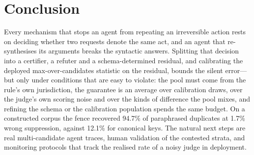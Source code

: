 \section{Conclusion}\label{sec:conclusion}

Every mechanism that stops an agent from repeating an irreversible action rests on deciding whether two requests denote the same act, and an agent that re-synthesises its arguments breaks the syntactic answers. Splitting that decision into a certifier, a refuter and a schema-determined residual, and calibrating the deployed max-over-candidates statistic on the residual, bounds the silent error---but only under conditions that are easy to violate: the pool must come from the rule's own jurisdiction, the guarantee is an average over calibration draws, over the judge's own scoring noise and over the kinds of difference the pool mixes, and refining the schema or the calibration population spends the same budget. On a constructed corpus the fence recovered 94.7\% of paraphrased duplicates at 1.7\% wrong suppression, against 12.1\% for canonical keys. The natural next steps are real multi-candidate agent traces, human validation of the contested strata, and monitoring protocols that track the realised rate of a noisy judge in deployment.

